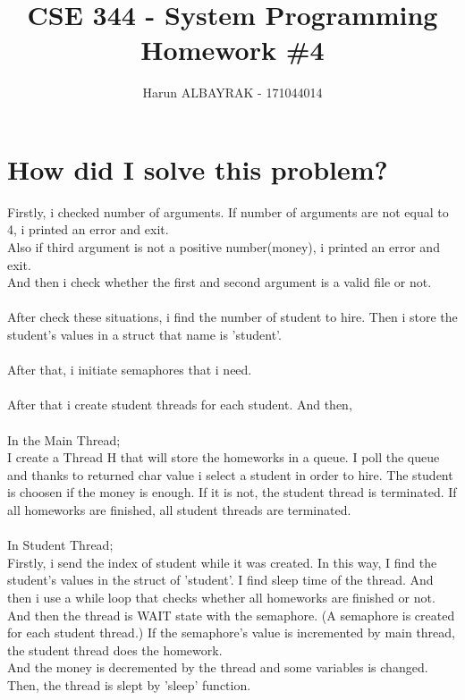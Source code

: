 \documentclass[20pt]{article}
\begin{document}
\title{%
  CSE 344 - System Programming \\
  \large Homework \#4}

\author{Harun ALBAYRAK - 171044014}

\maketitle

\Large
\section{How did I solve this problem?}
Firstly, i checked number of arguments. If number of arguments are not equal to 4, i printed an error and exit.\\
Also if third argument is not a positive number(money), i printed an error and exit. \\
And then i check whether the first and second argument is a valid file or not. 
\\\\
After check these situations, i find the number of student to hire. Then i store the student's values in a struct that name is 'student'.
\\\\
After that, i initiate semaphores that i need.
\\\\
After that i create student threads for each student. And then,
\\\\
In the Main Thread;\\
I create a Thread H that will store the homeworks in a queue.
I poll the queue and thanks to returned char value i select a student in order to hire.  
The student is choosen if the money is enough. If it is not, the student thread is terminated.
If all homeworks are finished, all student threads are terminated.
\\\\
In Student Thread;\\
Firstly, i send the index of student while it was created. In this way, I find the student's values in the struct of 'student'. I find sleep time of the thread. And then i use a while loop that checks whether all homeworks are finished or not. And then the thread is WAIT state with the semaphore. (A semaphore is created for each student thread.) If the semaphore's value is incremented by main thread, the student thread does the homework. \\
And the money is decremented by the thread and some variables is changed. Then, the thread is slept by 'sleep' function.
\\\\
\end{document}
